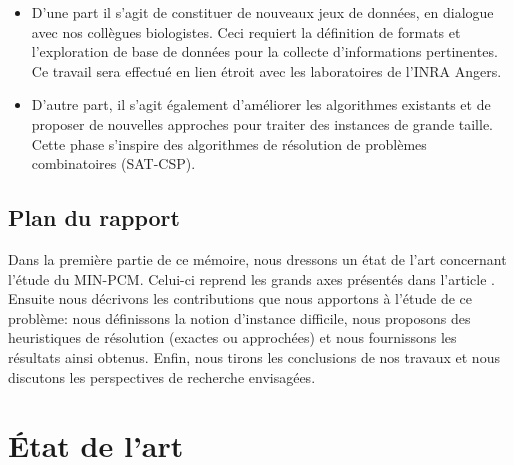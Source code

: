 \begin{itemize}
\item D'une part il s'agit de constituer de nouveaux jeux de données, en dialogue avec nos collègues
biologistes. Ceci requiert la définition de formats et l'exploration de base de données pour la collecte
d'informations pertinentes. Ce travail sera effectué en lien étroit avec les laboratoires de l'INRA
Angers.
\item D'autre part, il s'agit également d'améliorer les algorithmes existants et de proposer de nouvelles
approches pour traiter des instances de grande taille. Cette phase s'inspire des algorithmes de
résolution de problèmes combinatoires (SAT-CSP).
\end{itemize}

\subsection*{Plan du rapport}
Dans la première partie de ce mémoire, nous dressons un état de l'art concernant l'étude du MIN-PCM. Celui-ci reprend les grands axes présentés dans l'article \cite{Chhel2013}. Ensuite nous décrivons les contributions que nous apportons à l'étude de ce problème: nous définissons la notion d'instance difficile, nous proposons des heuristiques de résolution (exactes ou approchées) et nous fournissons les résultats ainsi obtenus. Enfin, nous tirons les conclusions de nos travaux et nous discutons les perspectives de recherche envisagées.

\newpage
\thispagestyle{empty}
\null
\newpage

\newpage
\setcounter{tocdepth}{3}
\tableofcontents
\newpage

\newpage
\thispagestyle{empty}
\null
\newpage

\section{État de l'art}




